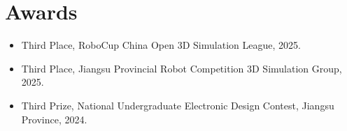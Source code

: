 \documentclass[10pt]{article}
\begin{document}
\section{Awards}\color{black}
\begin{itemize}
  \item Third Place, RoboCup China Open 3D Simulation League, 2025.
  \item Third Place, Jiangsu Provincial Robot Competition 3D Simulation Group, 2025.
  \item Third Prize, National Undergraduate Electronic Design Contest, Jiangsu Province, 2024.
\end{itemize}
\end{document}
